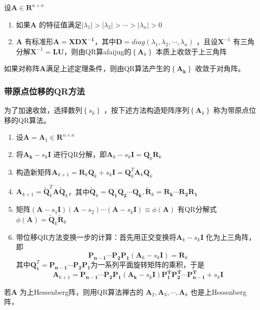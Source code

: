 \documentclass[a4paper]{article}
\begin{document}
\begin{theorem}
	设$\mathbf{A} \in \mathbf{R}^{n \times n}$ 
	\begin{enumerate}
	\item 如果$\mathbf{A}$ 的特征值满足$|\lambda_1| > |\lambda_2| > \cdots > |\lambda_n| > 0$ 
	\item $\mathbf{A}$ 有标准形$\mathbf{A} = \mathbf{XDX^{-1}}$，其中$\mathbf{D} = diag(\lambda_1, \lambda_2, \cdots, \lambda_n)$ ，且设$\mathbf{X}^{-1}$ 有三角分解$\mathbf{X}^{-1} = \mathbf{LU}$，则由QR算afaijug的$\left\{ \mathbf{A}_k \right\} $ 本质上收敛于上三角阵
	\end{enumerate}
\end{theorem}

\begin{theorem}
	如果对称阵$\mathbf{A}$满足上述定理条件，则由QR算法产生的$\left\{ \mathbf{A_k} \right\} $ 收敛于对角阵。
\end{theorem}

\subsubsection{带原点位移的QR方法}
为了加速收敛，选择数列$\left\{ s_k \right\} $ ，按下述方法构造矩阵序列$\left\{ \mathbf{A}_k \right\} $ 称为带原点位移的QR算法。
\begin{enumerate}
	\item 设$\mathbf{A} = \mathbf{A}_1 \in \mathbf{R}^{n \times n}$ 
	\item 将$\mathbf{A_k} - s_k \mathbf{I}$ 进行QR分解，即$\mathbf{A}_k - s_k \mathbf{I} = \mathbf{Q}_k \mathbf{R}_k$
	\item 构造新矩阵$\mathbf{A}_{k+1} = \mathbf{R}_k \mathbf{Q}_k + s_k \mathbf{I} = \mathbf{Q}_k^{T} \mathbf{A}_k \mathbf{Q}_k$ 
	\item $\mathbf{A}_{k+1} = \tilde{\mathbf{Q}}_k^{T} \mathbf{A} \tilde{\mathbf{Q}}_k$，其中$\tilde{\mathbf{Q}}_k = \mathbf{Q_1 Q_2 \cdots Q_k}, \tilde{\mathbf{R}}_k = \mathbf{R_k \cdots R_2 R_1}$ 
	\item 矩阵$(\mathbf{A} - s_1 \mathbf{I}) (\mathbf{A} - s_2) \cdots (\mathbf{A} - s_k \mathbf{I}) \equiv \phi(\mathbf{A})$ 有QR分解式$\phi(\mathbf{A}) = \tilde{\mathbf{Q}}_k \tilde{\mathbf{R}}_k$
	\item 带位移QR方法变换一步的计算：首先用正交变换将$\mathbf{A}_k - s_k \mathbf{I}$ 化为上三角阵，即
		\[
			\mathbf{P_{n-1} \cdots P_2 P_1} (\mathbf{A}_k - s_k \mathbf{I}) = \mathbf{R}_k
		\] 
		其中$\mathbf{Q}_k^{T} = \mathbf{P_{n-1} \cdots P_2 P_1}$为一系列平面旋转矩阵的乘积，于是
		\[
			\mathbf{A}_{k+1} = \mathbf{P_{n-1} \cdots P_2 P_1} (\mathbf{A_k} - s_k \mathbf{I}) \mathbf{P_1^{T} P_2^{T} \cdots P_{n-1}^{T}} + s_k \mathbf{I}
		\] 
\end{enumerate}

若$\mathbf{A}$ 为上Hessenberg阵，则用QR算法禅古的 $\mathbf{A}_2, \mathbf{A}_3, \cdots, \mathbf{A}_k$ 也是上Hessenberg阵，
\end{document}

